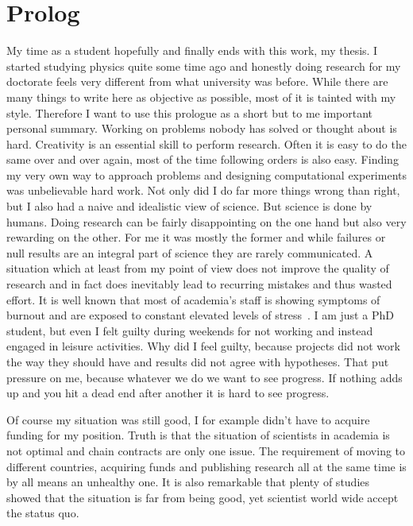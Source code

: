 \section*{Prolog}
\label{sec:prolog}
My time as a student hopefully and finally ends with this work, my thesis.
I started studying physics quite some time ago and honestly doing research for my doctorate feels very different from what university was before.
While there are many things to write here as objective as possible, most of it is tainted with my style.
Therefore I want to use this prologue as a short but to me important personal summary.
Working on problems nobody has solved or thought about is hard.
Creativity is an essential skill to perform research.
Often it is easy to do the same over and over again, most of the time following orders is also easy.
Finding my very own way to approach problems and designing computational experiments was unbelievable hard work. 
Not only did I do far more things wrong than right, but I also had a naive and idealistic view of science.
But science is done by humans.
Doing research can be fairly disappointing on the one hand but also very rewarding on the other.
For me it was mostly the former and while failures or null results are an integral part of science they are rarely communicated.
A situation which at least from my point of view does not improve the quality of research and in fact does inevitably lead to recurring mistakes and thus wasted effort.
It is well known that most of academia's staff is showing symptoms of burnout and are exposed to constant elevated levels of stress~\cite{gewin2021pandemic, bilge2006examining, henny2014prevalence, watts2011burnout, satinsky2021systematic}.
I am just a PhD student, but even I felt guilty during weekends for not working and instead engaged in leisure activities.
Why did I feel guilty, because projects did not work the way they should have and results did not agree with hypotheses.
That put pressure on me, because whatever we do we want to see progress.
If nothing adds up and you hit a dead end after another it is hard to see progress.

Of course my situation was still good, I for example didn't have to acquire funding for my position.
Truth is that the situation of scientists in academia is not optimal and chain contracts are only one issue.
The requirement of moving to different countries, acquiring funds and publishing research all at the same time is by all means an unhealthy one.
It is also remarkable that plenty of studies showed that the situation is far from being good, yet scientist world wide accept the status quo.

